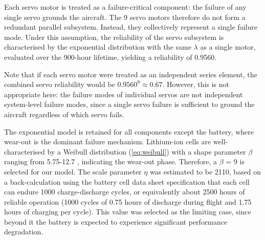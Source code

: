 

Each servo motor is treated as a failure-critical component: the failure of any single servo grounds the aircraft. The 9 servo motors therefore do not form a redundant parallel subsystem. Instead, they collectively represent a single failure mode. Under this assumption, the reliability of the servo subsystem is characterised by the exponential distribution with the same $\lambda$ as a single motor, evaluated over the 900-hour lifetime, yielding a reliability of 0.9560. 

Note that if each servo motor were treated as an independent series element, the combined servo reliability would be $0.9560^9 \approx 0.67$. However, this is not appropriate here: the failure modes of individual servos are not independent system-level failure modes, since a single servo failure is sufficient to ground the aircraft regardless of which servo fails. %

The exponential model is retained for all components except the battery, where wear-out is the dominant failure mechanism. Lithium-ion cells are well-characterised by a Weibull distribution (\autoref{eq:weibull}) with a shape parameter $\beta$ ranging from 5.75-12.7 \cite{Ganjeizadeh2014} \cite{Tsung-Hsun2026}, indicating the wear-out phase. Therefore, a $\beta$ = 9 is selected for our model. The scale parameter $\eta$ was estimated to be 2110, based on a back-calculation using the battery cell data sheet specification that each cell can endure 1000 charge-discharge cycles, or equivalently about 2500 hours of reliable operation (1000 cycles of 0.75 hours of discharge during flight and 1.75 hours of charging per cycle). This value was selected as the limiting case, since beyond it the battery is expected to experience significant performance degradation.

